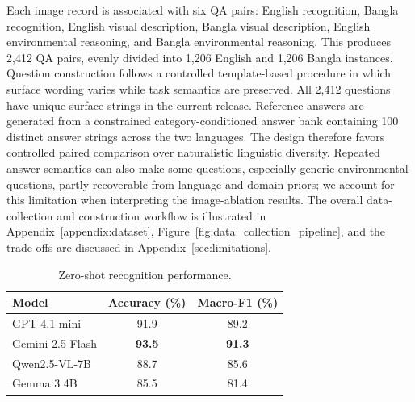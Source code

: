 \documentclass{article}
\begin{document}
Each image record is associated with six QA pairs: English recognition, Bangla recognition, English visual description, Bangla visual description, English environmental reasoning, and Bangla environmental reasoning. This produces 2,412 QA pairs, evenly divided into 1,206 English and 1,206 Bangla instances. Question construction follows a controlled template-based procedure in which surface wording varies while task semantics are preserved. All 2,412 questions have unique surface strings in the current release. Reference answers are generated from a constrained category-conditioned answer bank containing 100 distinct answer strings across the two languages. The design therefore favors controlled paired comparison over naturalistic linguistic diversity. Repeated answer semantics can also make some questions, especially generic environmental questions, partly recoverable from language and domain priors; we account for this limitation when interpreting the image-ablation results. The overall data-collection and construction workflow is illustrated in Appendix~\ref{appendix:dataset}, Figure~\ref{fig:data_collection_pipeline}, and the trade-offs are discussed in Appendix~\ref{sec:limitations}.


\begin{table}[t]
\centering
\caption{Zero-shot recognition performance.}
\label{tab:recognition_results}
\begin{tabular}{lcc}
\toprule
\textbf{Model} & \textbf{Accuracy (\%)} & \textbf{Macro-F1 (\%)} \\
\midrule
GPT-4.1 mini
& 91.9
& 89.2 \\

Gemini 2.5 Flash
& \textbf{93.5}
& \textbf{91.3} \\

Qwen2.5-VL-7B
& 88.7
& 85.6 \\

Gemma 3 4B
& 85.5
& 81.4 \\
\bottomrule
\end{tabular}
\end{table}
\end{document}
